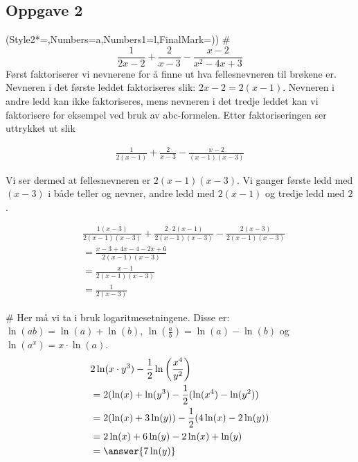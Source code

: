 \subsection*{Oppgave 2}
\begin{easylist}[enumerate]
	\ListProperties(Style2*=,Numbers=a,Numbers1=l,FinalMark={)})
	# 
	\begin{equation*}
		\frac{1}{2x-2} + \frac{2}{x-3} - \frac{x-2}{x^2 - 4x +3}
	\end{equation*}
	Først faktoriserer vi nevnerene for å finne ut hva fellesnevneren til brøkene er. Nevneren i det første leddet faktoriseres slik: $2x-2 = 2(x-1)$. Nevneren i andre ledd kan ikke faktoriseres, mens nevneren i det tredje leddet kan vi faktorisere for eksempel ved bruk av abc-formelen. Etter faktoriseringen ser uttrykket ut slik
	
	\begin{equation*}
		\begin{aligned}
			\frac{1}{2(x-1)} + \frac{2}{x-3} - \frac{x-2}{(x-1)(x-3)}
		\end{aligned}
	\end{equation*}
	
	Vi ser dermed at fellesnevneren er $2(x-1)(x-3)$. Vi ganger første ledd med $(x-3)$ i både teller og nevner, andre ledd med $2(x-1)$ og tredje ledd med $2$.
	
	\begin{equation*}
		\begin{aligned}
			&\frac{1(x-3)}{2(x-1)(x-3)} + \frac{2 \cdot 2(x-1)}{2(x-1)(x-3)} - \frac{2(x-3)}{2(x-1)(x-3)} \\
			& = \frac{x - 3 +4x - 4 - 2x + 6}{2(x-1)(x-3)} \\
													& = \frac{x-1}{2(x-1)(x-3)}\\
													& = \frac{1}{2(x-3)}
		\end{aligned}
	\end{equation*}
	
	# Her må vi ta i bruk logaritmesetningene. Disse er: $\ln(ab) = \ln(a) + \ln(b)$, $\ln\left(\frac{a}{b}\right) = \ln(a) - \ln(b)$ og $\ln(a^x) = x \cdot \ln(a)$.
	\begin{equation*}
		\begin{aligned}
		&2\ln(x\cdot y^3) - \frac{1}{2} \ln \left (\frac{x^4}{y^2} \right) \\
		& = 2(\ln(x) + \ln(y^3) - \frac{1}{2}(\ln(x^4) - \ln(y^2)) \\
		& = 2(\ln(x) + 3\ln(y)) - \frac{1}{2}(4\ln(x) - 2\ln(y))\\
		& = 2\ln(x) + 6\ln(y) - 2\ln(x) + \ln(y)\\
		& = \answer{7\ln(y)}
		\end{aligned}
	\end{equation*}
	
\end{easylist}

